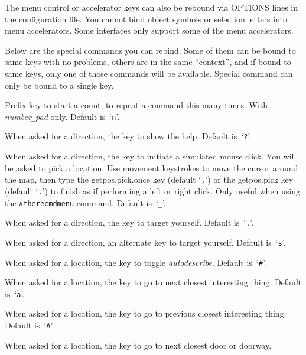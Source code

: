 \item[\tb{Menu accelerator keys}]
The menu control or accelerator keys can also be rebound via OPTIONS lines
in the configuration file.
You cannot bind object symbols or selection letters into menu accelerators.
Some interfaces only support some of the menu accelerators.

\item[\tb{Special command keys}]
Below are the special commands you can rebind. Some of them can be bound to
same keys with no problems, others are in the same ``context'', and if bound
to same keys, only one of those commands will be available. Special command
can only be bound to a single key.
\elist

\item[{\bb{count}}]
Prefix key to start a count, to repeat a command this many times.
With {\it number\verb+_+pad\/} only. Default is~`{\tt n}'.
\item[{\bb{getdir.help}}]
When asked for a direction, the key to show the help. Default is~`{\tt ?}'.
\item[{\bb{getdir.mouse}}]
When asked for a direction, the key to initiate a simulated mouse click.
You will be asked to pick a location.
Use movement keystrokes to move the cursor around the map, then type
the getpos.pick.once key (default `{\tt ,}')
or the getpos.pick key (default `{\tt .}')
to finish as if performing a left or right click.
Only useful when using the {\tt \#therecmdmenu} command.
Default is~`{\tt \verb+_+}'.
\item[{\bb{getdir.self}}]
When asked for a direction, the key to target yourself. Default is~`{\tt .}'.
\item[{\bb{getdir.self2}}]
When asked for a direction, an alternate key to target yourself.
Default is~`{\tt s}'.
\item[{\bb{getpos.autodescribe}}]
When asked for a location, the key to toggle {\it autodescribe\/}.
Default is~`{\tt \#}'.
\item[{\bb{getpos.all.next}}]
When asked for a location, the key to go to next closest interesting thing.
Default is~`{\tt a}'.
\item[{\bb{getpos.all.prev}}]
When asked for a location, the key to go to previous closest interesting thing.
Default is~`{\tt A}'.
\item[{\bb{getpos.door.next}}]
When asked for a location, the key to go to next closest door or doorway.
